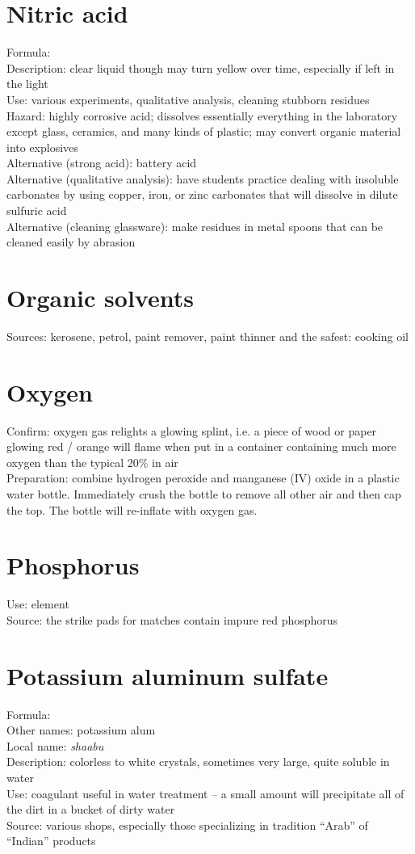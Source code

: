 \section{Nitric acid}
Formula: \\
Description: clear liquid though may turn yellow over time, 
especially if left in the light\\
Use: various experiments, 
qualitative analysis, 
cleaning stubborn residues\\
Hazard: highly corrosive acid; 
dissolves essentially everything in the laboratory except glass, 
ceramics, 
and many kinds of plastic; 
may convert organic material into explosives\\
Alternative (strong acid): battery acid\\
Alternative (qualitative analysis): 
have students practice dealing with insoluble carbonates by using copper, 
iron, 
or zinc carbonates that will dissolve in dilute sulfuric acid\\
Alternative (cleaning glassware): 
make residues in metal spoons that can be cleaned easily by abrasion

\section{Organic solvents}
Sources: kerosene, 
petrol, 
paint remover, 
paint thinner and the safest: cooking oil

\section{Oxygen}
Confirm: oxygen gas relights a glowing splint, 
i.e. 
a piece of wood or paper glowing red / orange 
will flame when put in a container 
containing much more oxygen than the typical 20\% in air\\
Preparation: combine hydrogen peroxide 
and manganese (IV) oxide in a plastic water bottle. 
Immediately crush the bottle to remove all other air and then cap the top. 
The bottle will re-inflate with oxygen gas.

\section{Phosphorus}
Use: element\\
Source: the strike pads for matches contain impure red phosphorus

\section{Potassium aluminum sulfate}
\label{sec:potalsulf}
Formula: \\
Other names: potassium alum\\
Local name: \textit{shaabu}\\
Description: colorless to white crystals, 
sometimes very large, 
quite soluble in water\\
Use: coagulant useful in water treatment -- 
a small amount will precipitate all of the dirt in a bucket of dirty water\\
Source: various shops, 
especially those specializing in tradition ``Arab'' of ``Indian'' products

